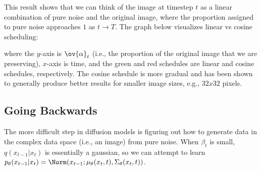 This result shows that we can think of the image at timestep $t$ as a linear combination of pure noise and the original image, where the proportion assigned to pure noise approaches $1$ as $t\rightarrow T$. The graph below visualizes linear vs cosine scheduling: 



where the $y$-axis is $\ov{\alpha}_t$ (i.e., the proportion of the original image that we are preserving), $x$-axis is time, and the green and red schedules are linear and cosine schedules, respectively. The cosine schedule is more gradual and has been shown to generally produce better results for smaller image sizes, e.g., $32x32$ pixels. 

\subsection{Going Backwards}

The more difficult step in diffusion models is figuring out how to generate data in the complex data space (i.e., an image) from pure noise. When $\beta_t$ is small, $q(x_{t-1}|x_t)$ is essentially a gaussian, so we can attempt to learn $p_{\theta}(x_{t-1}|x_t) = \Norm(x_{t-1}; \mu_{\theta}(x_t,t), \Sigma_{\theta}(x_t,t))$. 

